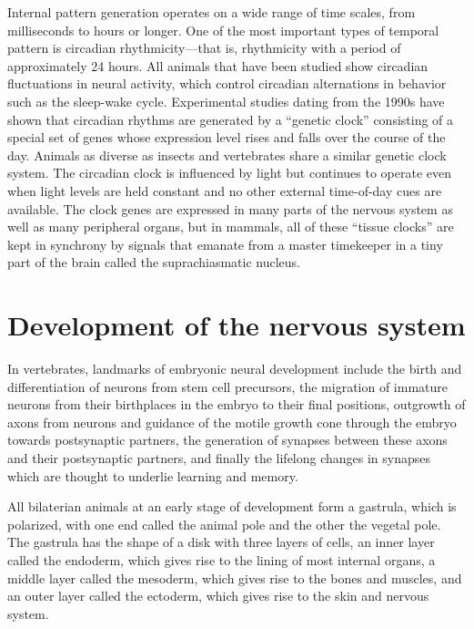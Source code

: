 \documentclass[]{book}
\begin{document}
Internal pattern generation operates on a wide range of time scales, from milliseconds to hours or longer. One of the most important types of temporal pattern is circadian rhythmicity---that is, rhythmicity with a period of approximately 24 hours. All animals that have been studied show circadian fluctuations in neural activity, which control circadian alternations in behavior such as the sleep-wake cycle. Experimental studies dating from the 1990s have shown that circadian rhythms are generated by a ``genetic clock'' consisting of a special set of genes whose expression level rises and falls over the course of the day. Animals as diverse as insects and vertebrates share a similar genetic clock system. The circadian clock is influenced by light but continues to operate even when light levels are held constant and no other external time-of-day cues are available. The clock genes are expressed in many parts of the nervous system as well as many peripheral organs, but in mammals, all of these ``tissue clocks'' are kept in synchrony by signals that emanate from a master timekeeper in a tiny part of the brain called the suprachiasmatic nucleus.

\hypertarget{development-of-the-nervous-system}{%
\section{Development of the nervous system}\label{development-of-the-nervous-system}}

In vertebrates, landmarks of embryonic neural development include the birth and differentiation of neurons from stem cell precursors, the migration of immature neurons from their birthplaces in the embryo to their final positions, outgrowth of axons from neurons and guidance of the motile growth cone through the embryo towards postsynaptic partners, the generation of synapses between these axons and their postsynaptic partners, and finally the lifelong changes in synapses which are thought to underlie learning and memory.

All bilaterian animals at an early stage of development form a gastrula, which is polarized, with one end called the animal pole and the other the vegetal pole. The gastrula has the shape of a disk with three layers of cells, an inner layer called the endoderm, which gives rise to the lining of most internal organs, a middle layer called the mesoderm, which gives rise to the bones and muscles, and an outer layer called the ectoderm, which gives rise to the skin and nervous system.
\end{document}
